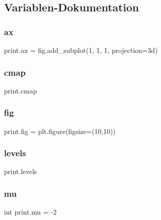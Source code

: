 \subsection{Variablen-\/\+Dokumentation}
\mbox{\label{namespaceprint_a980229015cfaa5dda779f5e1df7e4013}} 
\subsubsection{\texorpdfstring{ax}{ax}}
{\footnotesize\ttfamily print.\+ax = fig.\+add\+\_\+subplot(1, 1, 1, projection=\textquotesingle{}3d\textquotesingle{})}

\mbox{\label{namespaceprint_a4c39ba09ea1a62ecd2fc116b9ef27c42}} 
\subsubsection{\texorpdfstring{cmap}{cmap}}
{\footnotesize\ttfamily print.\+cmap}

\mbox{\label{namespaceprint_a8080002122fd53cadd2b548837d037aa}} 
\subsubsection{\texorpdfstring{fig}{fig}}
{\footnotesize\ttfamily print.\+fig = plt.\+figure(figsize=(10,10))}

\mbox{\label{namespaceprint_a811f3257310281e4a58230ebd65dcc71}} 
\subsubsection{\texorpdfstring{levels}{levels}}
{\footnotesize\ttfamily print.\+levels}

\mbox{\label{namespaceprint_a0d1f4b3564b3a18949e4a9d42c0fe83b}} 
\subsubsection{\texorpdfstring{mu}{mu}}
{\footnotesize\ttfamily int print.\+mu = -\/2}

